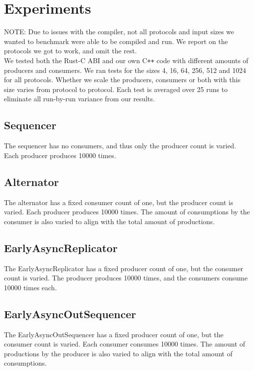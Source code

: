 \section{Experiments}
NOTE: Due to issues with the compiler, not all protocols and input sizes we wanted to benchmark were able to be compiled and run. We report on the protocols we got to work, and omit the rest. \\

\noindent We tested both the Rust-C ABI and our own C\texttt{++} code with different amounts of producers and consumers. We ran tests for the sizes 4, 16, 64, 256, 512 and 1024 for all protocols. Whether we scale the producers, consumers or both with this size varies from protocol to protocol. Each test is averaged over 25 runs to eliminate all run-by-run variance from our results. 

\subsection{Sequencer}
The sequencer has no consumers, and thus only the producer count is varied. Each producer produces 10000 times.

\subsection{Alternator}
The alternator has a fixed consumer count of one, but the producer count is varied. Each producer produces 10000 times. The amount of consumptions by the consumer is also varied to align with the total amount of productions.

\subsection{EarlyAsyncReplicator}
The EarlyAsyncReplicator has a fixed producer count of one, but the consumer count is varied. The producer produces 10000 times, and the consumers consume 10000 times each.

\subsection{EarlyAsyncOutSequencer}
The EarlyAsyncOutSequencer has a fixed producer count of one, but the consumer count is varied. Each consumer consumes 10000 times. The amount of productions by the producer is also varied to align with the total amount of consumptions.
